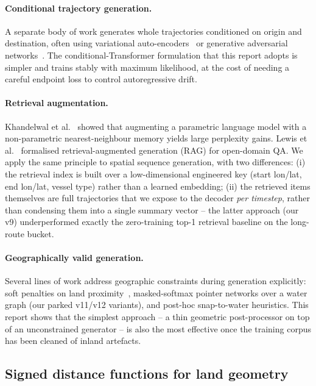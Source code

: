 \documentclass[11pt,a4paper]{article}
\begin{document}
\paragraph{Conditional trajectory generation.}
A separate body of work generates whole trajectories conditioned on
origin and destination, often using variational
auto-encoders~\cite{liang2022generative} or generative adversarial
networks~\cite{wang2019tggan}.  The conditional-Transformer formulation
that this report adopts is simpler and trains stably with maximum
likelihood, at the cost of needing a careful endpoint loss to control
autoregressive drift.

\paragraph{Retrieval augmentation.}
Khandelwal et al.~\cite{khandelwal2020nearest} showed that augmenting a
parametric language model with a non-parametric nearest-neighbour
memory yields large perplexity gains.  Lewis et
al.~\cite{lewis2020retrieval} formalised retrieval-augmented generation
(RAG) for open-domain QA.  We apply the same principle to spatial
sequence generation, with two differences:
(i) the retrieval index is built over a low-dimensional engineered key
(start lon/lat, end lon/lat, vessel type) rather than a learned embedding;
(ii) the retrieved items themselves are full trajectories that we expose
to the decoder \emph{per timestep}, rather than condensing them into a
single summary vector -- the latter approach (our v9) underperformed
exactly the zero-training top-1 retrieval baseline on the long-route
bucket.

\paragraph{Geographically valid generation.}
Several lines of work address geographic constraints during generation
explicitly: soft penalties on land
proximity~\cite{capobianco2021lstm}, masked-softmax pointer networks
over a water graph (our parked v11/v12 variants),
and post-hoc snap-to-water heuristics.  This report shows that the
simplest approach -- a thin geometric post-processor on top of an
unconstrained generator -- is also the most effective once the training
corpus has been cleaned of inland artefacts.

\subsection{Signed distance functions for land geometry}
\end{document}
